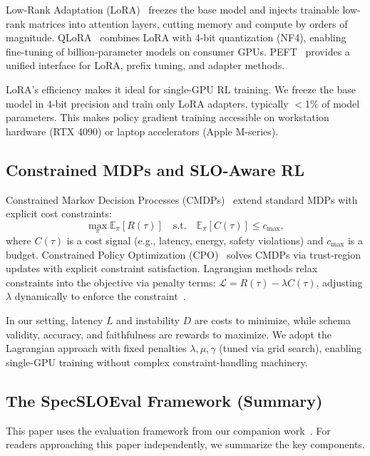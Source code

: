 \documentclass[11pt]{article}
\begin{document}
Low-Rank Adaptation (LoRA)~\citep{hu2021lora} freezes the base model and injects trainable low-rank matrices into attention layers, cutting memory and compute by orders of magnitude.
QLoRA~\citep{dettmers2023qlora} combines LoRA with 4-bit quantization (NF4), enabling fine-tuning of billion-parameter models on consumer GPUs.
PEFT~\citep{mangrulkar2022peft} provides a unified interface for LoRA, prefix tuning, and adapter methods.

LoRA's efficiency makes it ideal for single-GPU RL training.  We freeze the base model in 4-bit precision and train only LoRA adapters, typically $<$1\% of model parameters.
This makes policy gradient training accessible on workstation hardware (RTX 4090) or laptop accelerators (Apple M-series).

\subsection{Constrained MDPs and SLO-Aware RL}

Constrained Markov Decision Processes (CMDPs)~\citep{altman1999cmdp} extend standard MDPs with explicit cost constraints:
\begin{equation}
\max_{\pi} \mathbb{E}_{\pi} [R(\tau)] \quad \text{s.t.} \quad \mathbb{E}_{\pi} [C(\tau)] \leq c_{\max},
\end{equation}
where $C(\tau)$ is a cost signal (e.g., latency, energy, safety violations) and $c_{\max}$ is a budget.
Constrained Policy Optimization (CPO)~\citep{achiam2017cpo} solves CMDPs via trust-region updates with explicit constraint satisfaction.
Lagrangian methods relax constraints into the objective via penalty terms: $\mathcal{L} = R(\tau) - \lambda C(\tau)$, adjusting $\lambda$ dynamically to enforce the constraint~\citep{ray2019benchmarking}.

In our setting, latency $L$ and instability $D$ are costs to minimize, while schema validity, accuracy, and faithfulness are rewards to maximize.
We adopt the Lagrangian approach with fixed penalties $\lambda, \mu, \gamma$ (tuned via grid search), enabling single-GPU training without complex constraint-handling machinery.

\subsection{The SpecSLOEval Framework (Summary)}
\label{sec:specsloeval-summary}

This paper uses the evaluation framework from our companion work~\citep{maloney2025deploymentgap}.
For readers approaching this paper independently, we summarize the key components.
\end{document}
